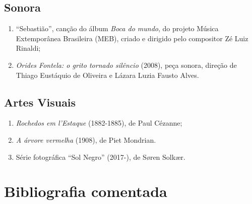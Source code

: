 \documentclass[12pt]{extarticle}
\begin{document}
\subsection{Sonora}

\begin{enumerate}
\item
  ``Sebastião'', canção do álbum \emph{Boca do mundo}, do projeto Música
  Extemporânea Brasileira (MEB), criado e dirigido pelo compositor Zé
  Luiz Rinaldi;
\item
  \emph{Orides Fontela: o grito tornado silêncio} (2008), peça sonora,
  direção de Thiago Eustáquio de Oliveira e Lázara Luzia Fausto Alves.
\end{enumerate}

\subsection{Artes Visuais}

\begin{enumerate}
\item
  \emph{Rochedos em l'Estaque} (1882-1885), de Paul Cézanne;
\item
  \emph{A árvore vermelha} (1908), de Piet Mondrian.
\item
  Série fotográfica ``Sol Negro'' (2017-), de Søren Solkær.
\end{enumerate}

\section{Bibliografia comentada}
\end{document}
